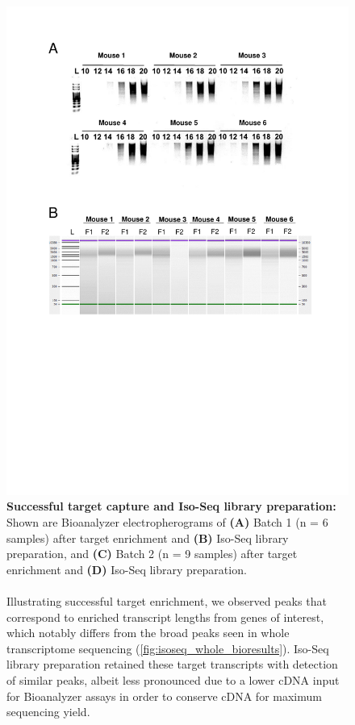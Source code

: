 \begin{figure}[!htp]
	\centering
	\vspace{20pt}
	\includegraphics[page=2,trim={0 15cm 0cm 1cm},clip,scale = 0.75]{Figures/TargetedTranscriptome_LabResults.pdf}
	\captionsetup{width=0.95\textwidth}
	\caption[Iso-Seq Targeted Transcriptome - Target Capture and library preparation]%
	{\textbf{Successful target capture and Iso-Seq library preparation:} Shown are Bioanalyzer electropherograms of \textbf{(A)} Batch 1 (n = 6 samples) after target enrichment and \textbf{(B)} Iso-Seq library preparation, and \textbf{(C)} Batch 2 (n = 9 samples) after target enrichment and \textbf{(D)} Iso-Seq library preparation. 
	\\
	\\
	Illustrating successful target enrichment, we observed peaks that correspond to enriched transcript lengths from genes of interest, which notably differs from the broad peaks seen in whole transcriptome sequencing (\cref{fig:isoseq_whole_bioresults}). Iso-Seq library preparation retained these target transcripts with detection of similar peaks, albeit less pronounced due to a lower cDNA input for Bioanalyzer assays in order to conserve cDNA for maximum sequencing yield.}  
	\label{fig:isoseq_targeted_libresults}
\end{figure}

